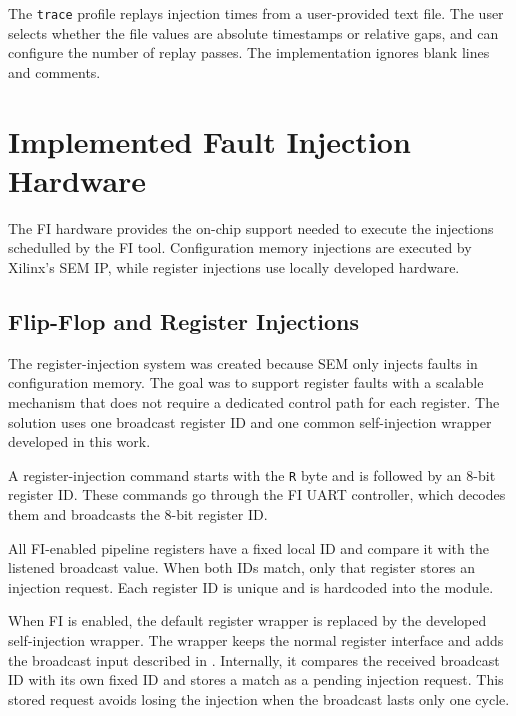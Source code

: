 The \texttt{trace} profile replays injection times from a user-provided text file. The user selects whether the file values are absolute timestamps or relative gaps, and can configure the number of replay passes. The implementation ignores blank lines and comments.










\section{Implemented Fault Injection Hardware}
\label{chap8:fi_hardware}

The \ac{FI} hardware provides the on-chip support needed to execute the injections schedulled by the \ac{FI} tool. Configuration memory injections are executed by Xilinx's \ac{SEM} \ac{IP}, while register injections use locally developed hardware.




\subsection{Flip-Flop and Register Injections}
\label{chap8:fi_reg_injections}

The register-injection system was created because \ac{SEM} only injects faults in configuration memory. The goal was to support register faults with a scalable mechanism that does not require a dedicated control path for each register. The solution uses one broadcast register ID and one common self-injection wrapper developed in this work.

A register-injection command starts with the \texttt{R} byte and is followed by an 8-bit register ID. These commands go through the \ac{FI} \ac{UART} controller, which decodes them and broadcasts the 8-bit register ID. 

All \ac{FI}-enabled pipeline registers have a fixed local ID and compare it with the listened broadcast value. When both IDs match, only that register stores an injection request. Each register ID is unique and is hardcoded into the module.

When \ac{FI} is enabled, the default register wrapper is replaced by the developed self-injection wrapper. The wrapper keeps the normal register interface and adds the broadcast input described in . Internally, it compares the received broadcast ID with its own fixed ID and stores a match as a pending injection request. This stored request avoids losing the injection when the broadcast lasts only one cycle.

